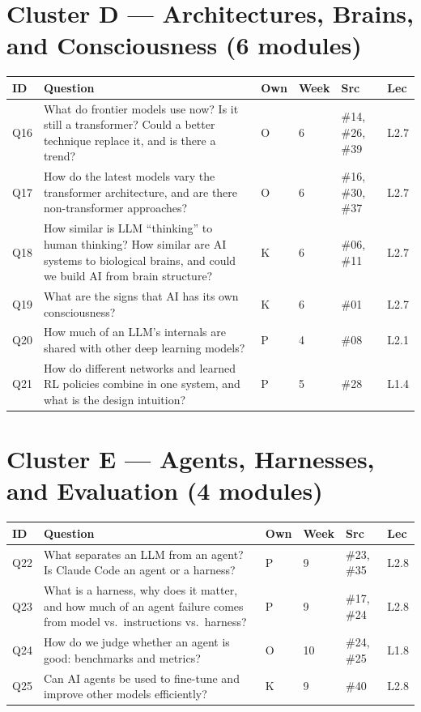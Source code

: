 \documentclass[11pt,letterpaper]{article}
\begin{document}
\section*{Cluster D --- Architectures, Brains, and Consciousness (6 modules)}

\begin{longtable}{C{1.1cm} Q C{0.8cm} C{1.0cm} C{1.5cm} C{1.5cm}}
\toprule
\textbf{ID} & \textbf{Question} & \textbf{Own} & \textbf{Week} & \textbf{Src} & \textbf{Lec} \\
\midrule
Q16 & What do frontier models use now? Is it still a transformer? Could a better technique replace it, and is there a trend? & O & 6 & \#14, \#26, \#39 & L2.7 \\
Q17 & How do the latest models vary the transformer architecture, and are there non-transformer approaches? & O & 6 & \#16, \#30, \#37 & L2.7 \\
Q18 & How similar is LLM ``thinking'' to human thinking? How similar are AI systems to biological brains, and could we build AI from brain structure? & K & 6 & \#06, \#11 & L2.7 \\
Q19 & What are the signs that AI has its own consciousness? & K & 6 & \#01 & L2.7 \\
Q20 & How much of an LLM's internals are shared with other deep learning models? & P & 4 & \#08 & L2.1 \\
Q21 & How do different networks and learned RL policies combine in one system, and what is the design intuition? & P & 5 & \#28 & L1.4 \\
\bottomrule
\end{longtable}

\section*{Cluster E --- Agents, Harnesses, and Evaluation (4 modules)}

\begin{longtable}{C{1.1cm} Q C{0.8cm} C{1.0cm} C{1.5cm} C{1.5cm}}
\toprule
\textbf{ID} & \textbf{Question} & \textbf{Own} & \textbf{Week} & \textbf{Src} & \textbf{Lec} \\
\midrule
Q22 & What separates an LLM from an agent? Is Claude Code an agent or a harness? & P & 9 & \#23, \#35 & L2.8 \\
Q23 & What is a harness, why does it matter, and how much of an agent failure comes from model vs.\ instructions vs.\ harness? & P & 9 & \#17, \#24 & L2.8 \\
Q24 & How do we judge whether an agent is good: benchmarks and metrics? & O & 10 & \#24, \#25 & L1.8 \\
Q25 & Can AI agents be used to fine-tune and improve other models efficiently? & K & 9 & \#40 & L2.8 \\
\bottomrule
\end{longtable}
\end{document}
